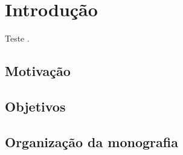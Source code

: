\chapter{Introdução} 

Teste \cite{lara_study_2015}.

\section{Motivação}

\section{Objetivos}

\section{Organização da monografia}
